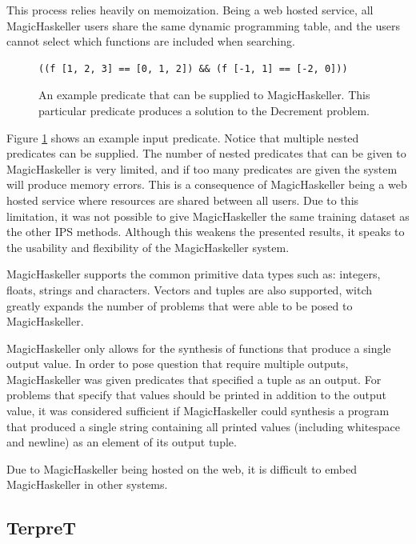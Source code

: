 This process relies heavily on memoization. Being a web hosted service, all MagicHaskeller users share the same dynamic programming table, and the users cannot select which functions are included when searching.

\begin{figure}
\begin{verbatim}
((f [1, 2, 3] == [0, 1, 2]) && (f [-1, 1] == [-2, 0]))  
\end{verbatim}
\caption{An example predicate that can be supplied to MagicHaskeller. This particular predicate produces a solution to the Decrement problem.}
\label{fig:MHpred}
\end{figure}

Figure \ref{fig:MHpred} shows an example input predicate. Notice that multiple nested predicates can be supplied. The number of nested predicates that can be given to MagicHaskeller is very limited, and if too many predicates are given the system will produce memory errors. This is a consequence of MagicHaskeller being a web hosted service where resources are shared between all users. Due to this limitation, it was not possible to give MagicHaskeller the same training dataset as the other IPS methods. Although this weakens the presented results, it speaks to the usability and flexibility of the MagicHaskeller system.

MagicHaskeller supports the common primitive data types such as: integers, floats, strings and characters. Vectors and tuples are also supported, witch greatly expands the number of problems that were able to be posed to MagicHaskeller.

MagicHaskeller only allows for the synthesis of functions that produce a single output value. In order to pose question that require multiple outputs, MagicHaskeller was given predicates that specified a tuple as an output. For problems that specify that values should be printed in addition to the output value, it was considered sufficient if MagicHaskeller could synthesis a program that produced a single string containing all printed values (including whitespace and newline) as an element of its output tuple.

Due to MagicHaskeller being hosted on the web, it is difficult to embed MagicHaskeller in other systems.

\subsection{TerpreT}

